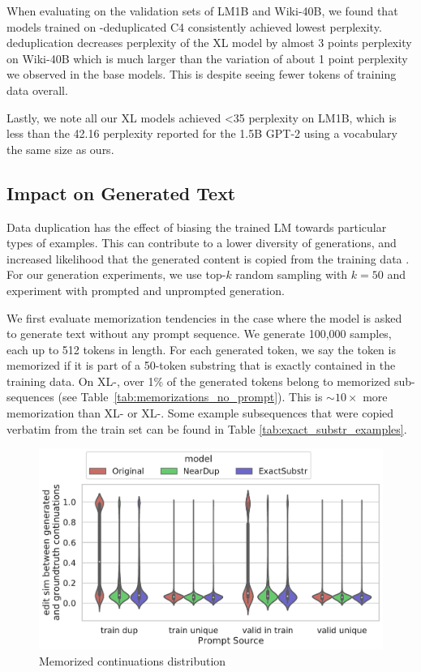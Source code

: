 When evaluating on the validation sets of LM1B and Wiki-40B, we found that models trained on \Approx-deduplicated C4 consistently achieved lowest perplexity.
\Exact{} deduplication decreases perplexity of the XL model by almost 3 points perplexity on Wiki-40B which is much larger than the variation of about 1 point perplexity we observed in the base models.
This is despite seeing fewer tokens of training data overall.

Lastly, we note all our XL models achieved  <35 perplexity on LM1B, which is less than the 42.16 perplexity reported for the 1.5B GPT-2 using a vocabulary the same size as ours.


\subsection{Impact on Generated Text}
\label{sec:memorization-results}
Data duplication has the effect of biasing the trained LM towards particular types of examples. 
This can contribute to a lower diversity of generations, and increased likelihood that the generated content is copied from the training data \citep{carlini2020extracting}.
For our generation experiments, we use top-$k$ random sampling with $k=50$ and experiment with prompted and unprompted generation.


We first evaluate memorization tendencies in the case where the model is asked to generate text without any prompt sequence.
We generate 100,000 samples, each up to 512 tokens in length.
For each generated token, we say the token is memorized if it is part of a 50-token substring that is exactly contained in the training data.
On XL-\Original, over 1\% of the generated tokens belong to memorized sub-sequences (see Table~\ref{tab:memorizations_no_prompt}).
This is $\sim10\times$ more memorization than XL-\Exact{} or XL-\Approx.
Some example subsequences that were copied verbatim from the train set can be found in Table \ref{tab:exact_substr_examples}.



\begin{figure}[h]
    \centering
    \includegraphics[width=0.5\linewidth]{figures/memorized_continuations_distribution.pdf}
    \caption{Memorized continuations distribution}
    \label{fig:mem-cont-dist}
\end{figure}

